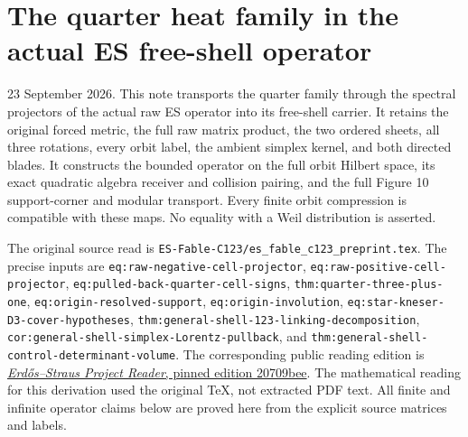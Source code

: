\documentclass[
  10pt,
  a4paper,
]{article}
\author{}
\date{}
\begin{document}
{
\setcounter{tocdepth}{3}
\tableofcontents
}
\section{The quarter heat family in the actual ES free-shell
operator}\label{the-quarter-heat-family-in-the-actual-es-free-shell-operator}

23 September 2026. This note transports the quarter family through the
spectral projectors of the actual raw ES operator into its free-shell
carrier. It retains the original forced metric, the full raw matrix
product, the two ordered sheets, all three rotations, every orbit label,
the ambient simplex kernel, and both directed blades. It constructs the
bounded operator on the full orbit Hilbert space, its exact quadratic
algebra receiver and collision pairing, and the full Figure 10
support-corner and modular transport. Every finite orbit compression is
compatible with these maps. No equality with a Weil distribution is
asserted.

The original source read is
\texttt{ES-\allowbreak{}Fable-\allowbreak{}C123/\allowbreak{}es\_\allowbreak{}fable\_\allowbreak{}c123\_\allowbreak{}preprint.\allowbreak{}tex}. The precise inputs
are \texttt{eq:\allowbreak{}raw-\allowbreak{}negative-\allowbreak{}cell-\allowbreak{}projector},
\texttt{eq:\allowbreak{}raw-\allowbreak{}positive-\allowbreak{}cell-\allowbreak{}projector},
\texttt{eq:\allowbreak{}pulled-\allowbreak{}back-\allowbreak{}quarter-\allowbreak{}cell-\allowbreak{}signs},
\texttt{thm:\allowbreak{}quarter-\allowbreak{}three-\allowbreak{}plus-\allowbreak{}one},
\texttt{eq:\allowbreak{}origin-\allowbreak{}resolved-\allowbreak{}support}, \texttt{eq:\allowbreak{}origin-\allowbreak{}involution},
\texttt{eq:\allowbreak{}star-\allowbreak{}kneser-\allowbreak{}D3-\allowbreak{}cover-\allowbreak{}hypotheses},
\texttt{thm:\allowbreak{}general-\allowbreak{}shell-\allowbreak{}123-\allowbreak{}linking-\allowbreak{}decomposition},
\texttt{cor:\allowbreak{}general-\allowbreak{}shell-\allowbreak{}simplex-\allowbreak{}Lorentz-\allowbreak{}pullback}, and
\texttt{thm:\allowbreak{}general-\allowbreak{}shell-\allowbreak{}control-\allowbreak{}determinant-\allowbreak{}volume}. The corresponding
public reading edition is
\href{https://github.com/KokunoYumeto/erdos-straus-foundation/blob/20709bee872ad10e4cc7d7b976d975e24532a803/00_ERDOS_STRAUSS_Project_Reader.pdf}{\emph{Erdős--Straus
Project Reader}, pinned edition 20709bee}. The mathematical reading for
this derivation used the original TeX, not extracted PDF text. All
finite and infinite operator claims below are proved here from the
explicit source matrices and labels.
\end{document}
